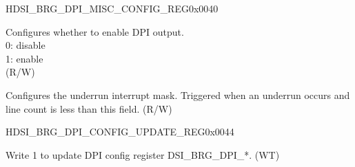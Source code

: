 \begin{register}{H}{DSI\_BRG\_DPI\_MISC\_CONFIG\_REG}{0x0040}\label{regdesc:DSIBRGDPIMISCCONFIGREG}
%
%
%
%
\regnewline%
\begin{regdesc}\begin{reglist}
\label{fielddesc:DSIBRGDPIEN}\item [DSI\_BRG\_DPI\_EN] Configures whether to enable DPI output. \\0: disable\\1: enable \\(R/W)
\label{fielddesc:DSIBRGFIFOUNDERRUNDISCARDVCNT}\item [DSI\_BRG\_FIFO\_UNDERRUN\_DISCARD\_VCNT] Configures the underrun interrupt mask. Triggered when an underrun occurs and line count is less than this field. (R/W)
\end{reglist}\end{regdesc}
\end{register}


\begin{register}{H}{DSI\_BRG\_DPI\_CONFIG\_UPDATE\_REG}{0x0044}\label{regdesc:DSIBRGDPICONFIGUPDATEREG}
%
%
\regnewline%
\begin{regdesc}\begin{reglist}
\label{fielddesc:DSIBRGDPICONFIGUPDATE}\item [DSI\_BRG\_DPI\_CONFIG\_UPDATE] Write 1 to update DPI config register DSI\_BRG\_DPI\_*. (WT)
\end{reglist}\end{regdesc}
\end{register}


